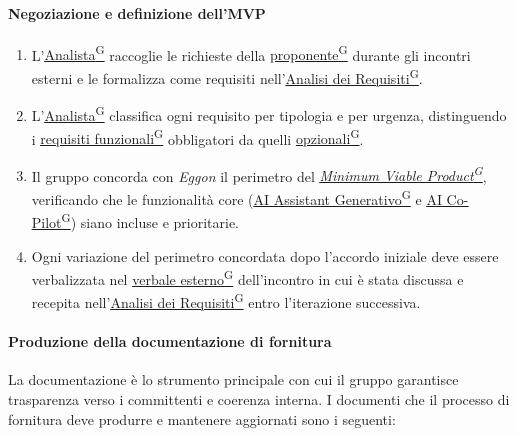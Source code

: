 \documentclass[a4paper,12pt]{article}
\providecommand{\glslink}[2]{\href{https://alittlebyte-19.github.io/Documentazione/glossario.html\#gls-#1}{\underline{#2}\textsuperscript{\scriptsize G}}}
\begin{document}
\paragraph{Negoziazione e definizione dell'MVP}
\begin{enumerate}
    \item L'\glslink{analista}{Analista} raccoglie le richieste della \glslink{committente-proponente}{proponente} durante gli incontri esterni e le formalizza come requisiti nell'\glslink{analisi-dei-requisiti-adr}{Analisi dei Requisiti}.
    \item L'\glslink{analista}{Analista} classifica ogni requisito per tipologia e per urgenza, distinguendo i \glslink{requisiti-funzionali}{requisiti funzionali} obbligatori da quelli \glslink{requisiti-opzionali}{opzionali}.
    \item Il gruppo concorda con \textit{Eggon} il perimetro del \textit{\glslink{mvp-minimum-viable-product}{Minimum Viable Product}}, verificando che le funzionalità core (\glslink{ai-assistant-generativo}{AI Assistant Generativo} e \glslink{ai-co-pilot-per-consulenti-del-lavoro-cdl}{AI Co-Pilot}) siano incluse e prioritarie.
    \item Ogni variazione del perimetro concordata dopo l'accordo iniziale deve essere verbalizzata nel \glslink{verbale-esterno}{verbale esterno} dell'incontro in cui è stata discussa e recepita nell'\glslink{analisi-dei-requisiti-adr}{Analisi dei Requisiti} entro l'iterazione successiva.
\end{enumerate}

\paragraph{Produzione della documentazione di fornitura}
La documentazione è lo strumento principale con cui il gruppo garantisce trasparenza verso i committenti e coerenza interna. I documenti che il processo di fornitura deve produrre e mantenere aggiornati sono i seguenti:
\end{document}
